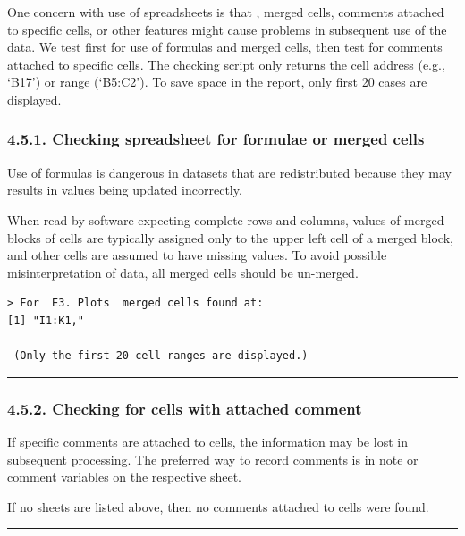 \documentclass[
]{article}
\begin{document}
One concern with use of spreadsheets is that , merged cells, comments
attached to specific cells, or other features might cause problems in
subsequent use of the data. We test first for use of formulas and merged
cells, then test for comments attached to specific cells. The checking
script only returns the cell address (e.g., `B17') or range (`B5:C2').
To save space in the report, only first 20 cases are displayed.

\subsubsection{4.5.1. Checking spreadsheet for formulae or merged
cells}\label{checking-spreadsheet-for-formulae-or-merged-cells}

Use of formulas is dangerous in datasets that are redistributed because
they may results in values being updated incorrectly.

When read by software expecting complete rows and columns, values of
merged blocks of cells are typically assigned only to the upper left
cell of a merged block, and other cells are assumed to have missing
values. To avoid possible misinterpretation of data, all merged cells
should be un-merged.

\begin{verbatim}
> For  E3. Plots  merged cells found at:
[1] "I1:K1,"

 (Only the first 20 cell ranges are displayed.)
\end{verbatim}

\begin{center}\rule{0.5\linewidth}{0.5pt}\end{center}

\subsubsection{4.5.2. Checking for cells with attached
comment}\label{checking-for-cells-with-attached-comment}

If specific comments are attached to cells, the information may be lost
in subsequent processing. The preferred way to record comments is in
note or comment variables on the respective sheet.

If no sheets are listed above, then no comments attached to cells were
found.

\begin{center}\rule{0.5\linewidth}{0.5pt}\end{center}
\end{document}
